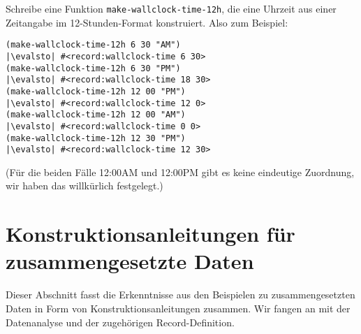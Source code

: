 \begin{aufgabeinline}
  Schreibe eine Funktion \lstinline{make-wallclock-time-12h}, die eine
  Uhrzeit aus einer Zeitangabe im 12-Stunden-Format konstruiert.  Also
  zum Beispiel:
\begin{lstlisting}
(make-wallclock-time-12h 6 30 "AM")
|\evalsto| #<record:wallclock-time 6 30>
(make-wallclock-time-12h 6 30 "PM")
|\evalsto| #<record:wallclock-time 18 30>
(make-wallclock-time-12h 12 00 "PM")
|\evalsto| #<record:wallclock-time 12 0>
(make-wallclock-time-12h 12 00 "AM")
|\evalsto| #<record:wallclock-time 0 0>
(make-wallclock-time-12h 12 30 "PM")
|\evalsto| #<record:wallclock-time 12 30>
\end{lstlisting}
  (Für die beiden Fälle 12:00AM und 12:00PM gibt es keine eindeutige
  Zuordnung, wir haben das willkürlich festgelegt.)
\end{aufgabeinline}

\section{Konstruktionsanleitungen für zusammengesetzte Daten}

Dieser Abschnitt fasst die Erkenntnisse aus den Beispielen
zu zusammengesetzten Daten in Form von Konstruktionsanleitungen
zusammen.  Wir fangen an mit der Datenanalyse und der zugehörigen
Record-Definition.

